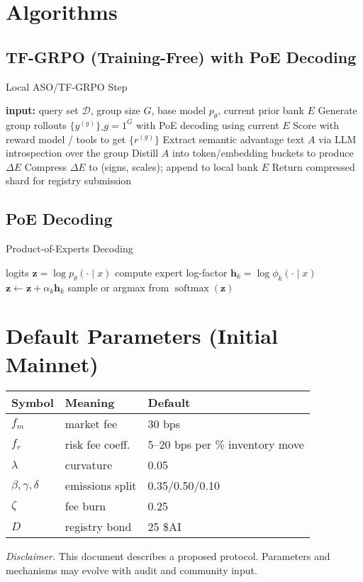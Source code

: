 \documentclass[11pt]{article}
\begin{document}
\section{Algorithms}
\subsection*{TF-GRPO (Training-Free) with PoE Decoding}
\begin{algorithm}[H]
\caption{Local ASO/TF-GRPO Step}
\begin{algorithmic}[1]
\State \textbf{input:} query set \(\mathcal D\), group size \(G\), base model \(p_\theta\), current prior bank \(E\)
  \State Generate group rollouts \(\{y^{(g)}\}\_{g=1}^G\) with PoE decoding using current \(E\)
  \State Score with reward model / tools to get \(\{r^{(g)}\}\)
  \State Extract semantic advantage text \(A\) via LLM introspection over the group
  \State Distill \(A\) into token/embedding buckets to produce \(\Delta E\)
  \State Compress \(\Delta E\) to (signs, scales); append to local bank \(E\)
\EndFor
\State Return compressed shard for registry submission
\end{algorithmic}
\end{algorithm}

\subsection*{PoE Decoding}
\begin{algorithm}[H]
\caption{Product-of-Experts Decoding}
\begin{algorithmic}[1]
\State logits \(\bm z = \log p_\theta(\cdot\mid x)\)
  \State compute expert log-factor \(\bm h_k = \log \phi_k(\cdot\mid x)\)
  \State \(\bm z \leftarrow \bm z + \alpha_k \bm h_k\)
\EndFor
\State sample or argmax from \(\operatorname{softmax}(\bm z)\)
\end{algorithmic}
\end{algorithm}

\section{Default Parameters (Initial Mainnet)}
\begin{table}[h]
\centering
\begin{tabular}{lll}
\toprule
Symbol & Meaning & Default \\
\midrule
\(f_m\) & market fee & 30 bps \\
\(f_r\) & risk fee coeff. & 5--20 bps per \% inventory move \\
\(\lambda\) & curvature & 0.05 \\
\(\beta,\gamma,\delta\) & emissions split & 0.35/0.50/0.10 \\
\(\zeta\) & fee burn & 0.25 \\
\(D\) & registry bond & 25 \$AI \\
\bottomrule
\end{tabular}
\end{table}

\vspace{1em}
\noindent\textit{Disclaimer.} This document describes a proposed protocol. Parameters and mechanisms may evolve with audit and community input.
\end{document}
